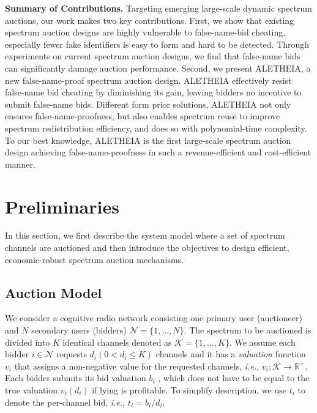\documentclass{sig-alternate}
\begin{document}
\textbf{Summary of Contributions.} Targeting emerging large-scale dynamic spectrum auctions, our work makes two key contributions. First, we show that existing spectrum auction designs are highly vulnerable to false-name-bid cheating, especially fewer fake identifiers is easy to form and hard to be detected. Through experiments on current spectrum auction designs, we find that false-name bids can significantly damage auction performance. Second, we present ALETHEIA, a new false-name-proof spectrum auction design. ALETHEIA effectively resist false-name bid cheating by diminishing its gain, leaving bidders no incentive to submit false-name bids. Different form prior solutions, ALETHEIA not only ensures false-name-proofness, but also enables spectrum reuse to improve spectrum redistribution efficiency, and does so with polynomial-time complexity. To our best knowledge, ALETHEIA is the first large-scale spectrum auction design achieving false-name-proofness in such a  revenue-efficient and cost-efficient manner.


\section{Preliminaries}
In this section, we first describe the system model where a set of spectrum channels are auctioned and then introduce the objectives to design efficient, economic-robust spectrum auction mechanisms.

\subsection{Auction Model}
We consider a cognitive radio network consisting one primary user (auctioneer) and $N$ secondary users (bidders) $\mathcal{N}=\{1,\ldots, N\}$. The spectrum to be auctioned is divided into $K$ identical channels denoted as $\mathcal{K} = \{1, \ldots, K\}$. We assume each bidder $i\in \mathcal{N}$ requests $d_i (0 < d_i\le K)$ channels and it has a \emph{valuation} function $v_i$ that assigns a non-negative value for the requested channels, \emph{i.e.,} $v_i: \mathcal{K} \rightarrow \mathbb{R}^{+}$. Each bidder submits its bid valuation $b_i$ , which does not have to be equal to the true valuation $v_i(d_i)$ if lying is profitable. To simplify description, we use $t_i$ to denote the per-channel bid, \emph{i.e.,} $t_i = b_i/d_i$.
%
\end{document}
